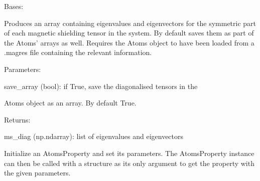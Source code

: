 \documentclass[letterpaper,10pt,english]{sphinxmanual}
\begin{document}
\begin{fulllineitems}
\label{doctree/soprano.properties.nmr.ms:soprano.properties.nmr.ms.MSDiagonal}
Bases: {\hyperref[doctree/soprano.properties.atomsproperty:soprano.properties.atomsproperty.AtomsProperty]{}}

Produces an array containing eigenvalues and eigenvectors for the
symmetric part of each magnetic shielding tensor in the system. By default
saves them as part of the Atoms' arrays as well.
Requires the Atoms object to have been loaded from a .magres file
containing the relevant information.

\begin{DUlineblock}{0em}
\item[] Parameters:
\item[]
\begin{DUlineblock}{\DUlineblockindent}
\item[] save\_array (bool): if True, save the diagonalised tensors in the
\item[]
\begin{DUlineblock}{\DUlineblockindent}
\item[] Atoms object as an array. By default True.
\end{DUlineblock}
\end{DUlineblock}
\end{DUlineblock}

\begin{DUlineblock}{0em}
\item[] Returns:
\item[]
\begin{DUlineblock}{\DUlineblockindent}
\item[] ms\_diag (np.ndarray): list of eigenvalues and eigenvectors
\end{DUlineblock}
\end{DUlineblock}

Initialize an AtomsProperty and set its parameters.
The AtomsProperty instance can then be called with a structure as its
only argument to get the property with the given parameters.


\end{fulllineitems}
\end{document}
